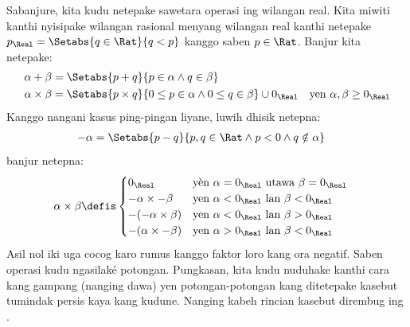 \documentclass[../../../include/open-logic-section]{subfiles}
\begin{document}
Sabanjure, kita kudu netepake sawetara operasi ing wilangan real. Kita
miwiti kanthi nyisipake wilangan rasional menyang wilangan real kanthi
netepake $p_\Real = \Setabs{q \in \Rat}{q < p}$ kanggo saben $p \in \Rat$.
Banjur kita netepake:
\begin{align*}
	\alpha + \beta &= \Setabs{p + q}{p \in \alpha \land q \in \beta}\\
	\alpha \times \beta &=
	\Setabs{p \times q}{0 \leq p \in \alpha \land 0 \leq q \in \beta} \cup 0_\Real & \text{yen }\alpha, \beta \geq 0_\Real
\end{align*}
Kanggo nangani kasus ping-pingan liyane, luwih dhisik netepna: %
\begin{align*}
	-\alpha &= \Setabs{p - q}{p,q \in \Rat \land p < 0 \land q \notin \alpha}
\end{align*}
banjur netepna:
\begin{align*}
	\alpha \times \beta &\defis
	\begin{cases}
		0_\Real &\text{yèn }\alpha=0_\Real \text{ utawa }\beta=0_\Real\\
		\mathord{-}\alpha \times \mathord{-}\beta &\text{yen }\alpha < 0_\Real\text{ lan }\beta < 0_\Real\\
		\mathord{-}(\mathord{-}\alpha \times \beta) &\text{yen }\alpha < 0_\Real \text{ lan }\beta > 0_\Real\\
		\mathord{-}(\alpha \times \mathord{-}\beta) &\text{yen }\alpha > 0_\Real \text{ lan }\beta < 0_\Real
	\end{cases}
\end{align*}
Asil nol iki uga cocog karo rumus kanggo faktor loro kang ora negatif.
Saben operasi kudu ngasilaké potongan.
Pungkasan, kita kudu nuduhake kanthi cara kang gampang (nanging dawa) yen
potongan-potongan kang ditetepake kasebut tumindak persis kaya kang kudune.
Nanging kabeh rincian kasebut dirembug ing .
\end{document}
